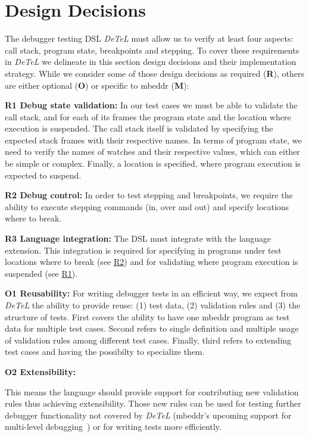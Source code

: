 \section{Design Decisions}
\label{DesignDecisions}

The debugger testing \ac{DSL} \emph{DeTeL} must allow us to verify at least
four aspects: call stack, program state, breakpoints and stepping.
To cover these requirements in \emph{DeTeL} we delineate in this section design
decisions and their implementation strategy. While we consider some of those
design decisions as required (\textbf{R}), others are either optional
(\textbf{O}) or specific to mbeddr (\textbf{M}):


\textbf{\label{R1}R1 Debug state validation:} In our test cases we
must be able to validate the call stack, and for each of its frames 
the program state and the location where execution is suspended. 
The call stack itself is validated by specifying the expected stack
frames with their respective names. In terms of program state, we need to verify
the names of watches and their respective values, which can either be simple
or complex. 
Finally, a location is specified, where program execution is expected to
suspend.

\textbf{\label{R2}R2 Debug control:} In order to test stepping
and breakpoints, we require the ability to execute stepping commands
(in, over and out) and specify locations where to break.

\textbf{\label{R3}R3 Language integration:} The
\ac{DSL} must integrate with the language extension.
This integration is required for specifying in programs under test
locations where to break (see \hyperref[R2]{R2}) and for validating where
program execution is suspended (see \hyperref[R1]{R1}).

\textbf{\label{O1}O1 Reusability:} For writing debugger tests in
an efficient way, we expect from \emph{DeTeL} the ability to provide reuse: (1)
test data, (2) validation rules and (3) the structure of tests. First covers
the ability to have one mbeddr program as test data for multiple test cases.
Second refers to single definition and multiple usage of validation rules among
different test cases. Finally, third refers to extending test cases and
having the possibilty to specialize them.

\textbf{\label{O2}O2 Extensibility:} 

This means the language should provide support for contributing new
validation rules thus achieving extensibility. Those new rules can be used for
testing further debugger functionality not covered by \emph{DeTeL} (\eg mbeddr's
upcoming support for multi-level debugging~\cite{MultiLevelDebugging:WSRE:breakedForInlining}) 
or for writing tests more efficiently.


